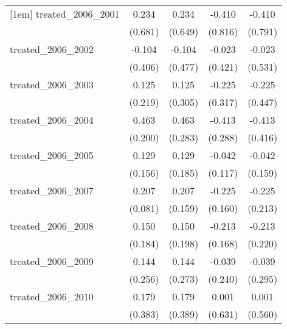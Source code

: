 {\begin{tabular}{l*{4}{c}}
[1em]
treated\_2006\_2001&       0.234         &       0.234         &      -0.410         &      -0.410         \\
            &     (0.681)         &     (0.649)         &     (0.816)         &     (0.791)         \\
[1em]
treated\_2006\_2002&      -0.104         &      -0.104         &      -0.023         &      -0.023         \\
            &     (0.406)         &     (0.477)         &     (0.421)         &     (0.531)         \\
[1em]
treated\_2006\_2003&       0.125         &       0.125         &      -0.225         &      -0.225         \\
            &     (0.219)         &     (0.305)         &     (0.317)         &     (0.447)         \\
[1em]
treated\_2006\_2004&       0.463\sym{*}  &       0.463         &      -0.413         &      -0.413         \\
            &     (0.200)         &     (0.283)         &     (0.288)         &     (0.416)         \\
[1em]
treated\_2006\_2005&       0.129         &       0.129         &      -0.042         &      -0.042         \\
            &     (0.156)         &     (0.185)         &     (0.117)         &     (0.159)         \\
[1em]
treated\_2006\_2007&       0.207\sym{*}  &       0.207         &      -0.225         &      -0.225         \\
            &     (0.081)         &     (0.159)         &     (0.160)         &     (0.213)         \\
[1em]
treated\_2006\_2008&       0.150         &       0.150         &      -0.213         &      -0.213         \\
            &     (0.184)         &     (0.198)         &     (0.168)         &     (0.220)         \\
[1em]
treated\_2006\_2009&       0.144         &       0.144         &      -0.039         &      -0.039         \\
            &     (0.256)         &     (0.273)         &     (0.240)         &     (0.295)         \\
[1em]
treated\_2006\_2010&       0.179         &       0.179         &       0.001         &       0.001         \\
            &     (0.383)         &     (0.389)         &     (0.631)         &     (0.560)         \\

\end{tabular}}
